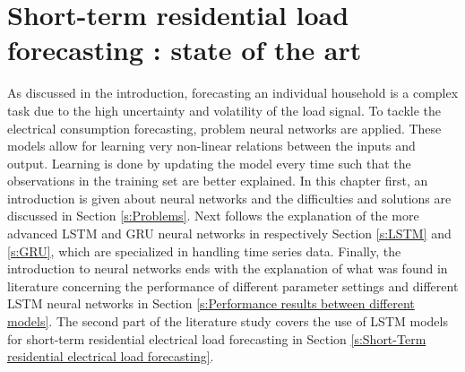 \chapter{Short-term residential load forecasting : state of the art}
\label{cha:State of the art short-term residential load forecasting techniques}
As discussed in the introduction, forecasting an individual household is a complex task due to the high uncertainty and volatility of the load signal. To tackle the electrical consumption forecasting, problem neural networks are applied. These models allow for learning very non-linear relations between the inputs and output. Learning is done by updating the model every time such that the observations in the training set are better explained. In this chapter first, an introduction is given about neural networks and the difficulties and solutions are discussed in Section \ref{s:Problems}. Next follows the explanation of the more advanced LSTM and GRU neural networks in respectively Section \ref{s:LSTM} and \ref{s:GRU}, which are specialized in handling time series data. Finally, the introduction to neural networks ends with the explanation of what was found in literature concerning the performance of different parameter settings and different LSTM neural networks in Section \ref{s:Performance results between different models}. The second part of the literature study covers the use of LSTM models for short-term residential electrical load forecasting in Section \ref{s:Short-Term residential electrical load forecasting}.


